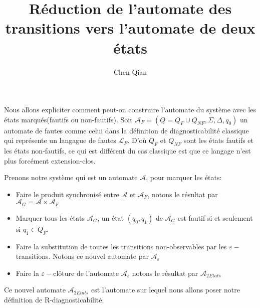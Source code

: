 \documentclass[a4paper,10pt]{article}
\title{R\'eduction de l'automate des transitions vers l'automate de deux \'etats}
\author{Chen Qian}
\begin{document}
\maketitle

Nous allons expliciter comment peut-on construire l'automate du syst\`eme avec les \'etats marqu\'es(fautifs ou non-fautifs). Soit $\mathcal{A}_F = (Q = Q_F\cup Q_{NF}, \Sigma, \Delta, q_0)$ un automate de fautes comme celui dans la d\'efinition de diagnosticabilit\'e classique qui repr\'esente un langague de fautes $\mathcal{L}_F$. D'o\`u $Q_F$ et $Q_{NF}$ sont les \'etats fautifs et les \'etats non-fautifs, ce qui est diff\'erent du cas classique est que ce langage n'est plus forc\'ement extension-clos.

Prenons notre syst\`eme qui est un automate $\mathcal{A}$, pour marquer les \'etats:

\begin{itemize}
\item Faire le produit synchronis\'e entre $\mathcal{A}$ et $\mathcal{A}_F$, notons le r\'esultat par  $\mathcal{A}_G = \mathcal{A} \times \mathcal{A}_F$
\item Marquer tous les \'etats $\mathcal{A}_G$, un \'etat $(q_0,q_1)$ de $\mathcal{A}_G$ est fautif si et seulement si $q_1 \in Q_F$.
\item Faire la substitution de toutes les transitions non-observables par les $\varepsilon-$transitions. Notons ce nouvel automate par $\mathcal{A}_\varepsilon$
\item Faire la $\varepsilon-$cl\^oture de l'automate $\mathcal{A}_\varepsilon$ notons le r\'esultat par $\mathcal{A}_{2Etats}$
\end{itemize}

Ce nouvel automate $\mathcal{A}_{2Etats}$ est l'automate sur lequel nous allons poser notre d\'efinition de R-diagnosticabilit\'e.
\end{document}
